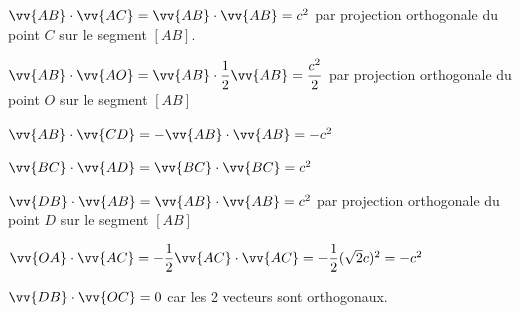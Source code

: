 \documentclass[11pt,a4paper]{article}  %
\begin{document}
\begin{corrBox}
\begin{enumMet}
	\item $\vv{A B} \cdot \vv{A C}=\vv{A B} \cdot \vv{A B}=c^{2}$ par projection orthogonale du point $C$ sur le segment $[A B]$.
	\item $\vv{A B} \cdot \vv{A O}=\vv{A B} \cdot \dfrac{1}{2} \vv{A B}=\dfrac{c^{2}}{2}$ par projection orthogonale du point $O$ sur le segment $[A B]$
	\item $\vv{A B} \cdot \vv{C D}=-\vv{A B} \cdot \vv{A B}=-c^{2}$
	\item $\vv{B C} \cdot \vv{A D}=\vv{B C} \cdot \vv{B C}=c^{2}$
	\item $\vv{D B} \cdot \vv{A B}=\vv{A B} \cdot \vv{A B}=c^{2}$ par projection orthogonale du point $D$ sur le segment $[A B]$
	\item $\vv{O A} \cdot \vv{A C}=-\dfrac{1}{2} \vv{A C} \cdot \vv{A C}=-\dfrac{1}{2}(\sqrt{2} c)^{2}=-c^{2}$
	\item $\vv{DB} \cdot \vv{OC}=0$ car les 2 vecteurs sont orthogonaux.
\end{enumMet}	
\end{corrBox}

\exercice{}  \\
\end{document}
